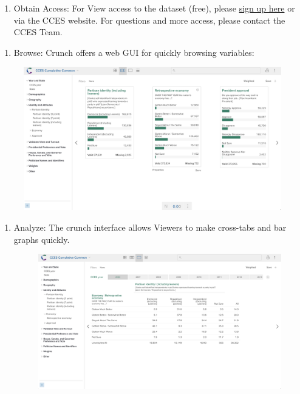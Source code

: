 \documentclass[10pt,article,oneside]{memoir}
\theoremstyle{definition}
\begin{document}
\begin{enumerate}
\def\labelenumi{\arabic{enumi}.}
\tightlist
\item
  Obtain Access: For View access to the dataset (free), please
  \href{https://tufts.qualtrics.com/jfe/form/SV_1A0vMbbE6j0fubr}{sign up
  here} or via the CCES website. For questions and more access, please
  contact the CCES Team.
\end{enumerate}

\newpage

\begin{enumerate}
\def\labelenumi{\arabic{enumi}.}
\setcounter{enumi}{1}
\tightlist
\item
  Browse: Crunch offers a web GUI for quickly browsing variables:
\end{enumerate}

\begin{figure}[H]
\centering
\centerline{\includegraphics[width=1.05\linewidth]{01_crunch_browse.png}}
\end{figure}

\begin{enumerate}
\def\labelenumi{\arabic{enumi}.}
\setcounter{enumi}{2}
\tightlist
\item
  Analyze: The crunch interface allows Viewers to make cross-tabs and
  bar graphs quickly.\\

  \begin{figure}[H]
  \centering
  \centerline{\includegraphics[width=1.05\linewidth]{02_crunch_tab.png}}
  \end{figure}
\end{enumerate}
\end{document}
